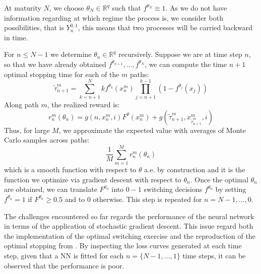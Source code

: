 \documentclass{article}
\begin{document}
At maturity $N$, we choose $\theta_N \in \mathbb{R}^q$ such that $f^{\theta_N}\equiv 1$. As we do not have information regarding at which regime the process is, we consider both possibilities, that is $Y_n^{0,1}$, this means that two processes will be carried backward in time.

For $n \leq N-1$ we determine $\theta_n \in \mathbb{R}^q$ recursively. Suppose we are at time step $n$, so that we have already obtained $f^{\theta_{n +1}}, \ldots, f^{\theta_N} $, we can compute the time $n+1$ optimal stopping time for each of the $m$ paths:
\begin{equation}
    \tilde{\tau}_{n+1}^m = \sum_{k=n+1}^N k f^{\theta_k}(x_n^m) \prod_{j=n+1}^{k-1}(1-f^{\theta_j}(x_j))
\end{equation}
Along path $m$, the realized reward is:
\begin{equation}
    r^m_n(\theta_n) = g(n, x_n^m, i)F^{\theta}(x_n^m)+g(\tilde{\tau}_{n+1}^m, x^m_{\tilde{\tau}^m_{n+1}}, i)
\end{equation}
Thus, for large $M$, we approximate the expected value with averages of Monte Carlo samples across paths:
\begin{equation}
    \frac{1}{M}\sum_{m=1}^M r_n^m(\theta_n)
\end{equation}
which is a smooth function with respect to $\theta$ a.e. by construction and it is the function we optimize via gradient descent with respect to $\theta_n$. Once the optimal $\theta_n$ are obtained, we can translate $F^{\theta_n}$ into $0-1$ switching decisions $f^{\theta_n}$ by setting $f^{\theta_n}=1$ if $F^{\theta_n} \geq 0.5$ and to $0$ otherwise. This step is repeated for $n=N-1, \ldots, 0$.

\smallskip

The challenges encountered so far regards the performance of the neural network in terms of the application of stochastic gradient descent. This issue regard both the implementation of the optimal switching exercise and the reproduction of the optimal stopping from \cite{becker2019deep}. By inspecting the loss curves generated at each time step, given that a NN is fitted for each $n=\{N-1, \ldots, 1\}$ time steps, it can be observed that the performance is poor. 
\end{document}
